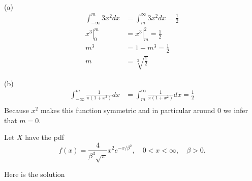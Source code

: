 \documentclass[12pt,letterpaper]{exam}
\begin{document}
\begin{questions}
	
	\begin{solution} \\
		(a)
		\begin{align*}
			\int_{-\infty}^{m} 3x^2 dx &= \int_{m}^{\infty} 3x^2 dx = \frac{1}{2} \\
			\left. x^3 \right|_{0}^{m} &= \left. x^3 \right|_{m}^{2} = \frac{1}{2} \\
			m^3 &= 1-m^3 = \frac{1}{2} \\
			m &= \sqrt[3]{\frac{1}{2}}
		\end{align*}
		
		(b)
		\begin{align*}
			\int_{-\infty}^{m} \frac{1}{\pi(1+x^2)} dx &= \int_{m}^{\infty} \frac{1}{\pi(1+x^2)} dx = \frac{1}{2} \\
		\end{align*}
		Because $x^2$ makes this function symmetric and in particular around $0$
		we infer that $m=0$.
		
	\end{solution}

	\setcounter{question}{21}
	\question Let $X$ have the pdf $$ f(x) = \frac{4}{\beta^3\sqrt{\pi}} x^2 e^{-x/\beta^2},\quad 0 < x < \infty,\quad \beta > 0.$$
	
	\begin{solution}
		Here is the solution
	\end{solution}
	

\end{questions}
\end{document}
